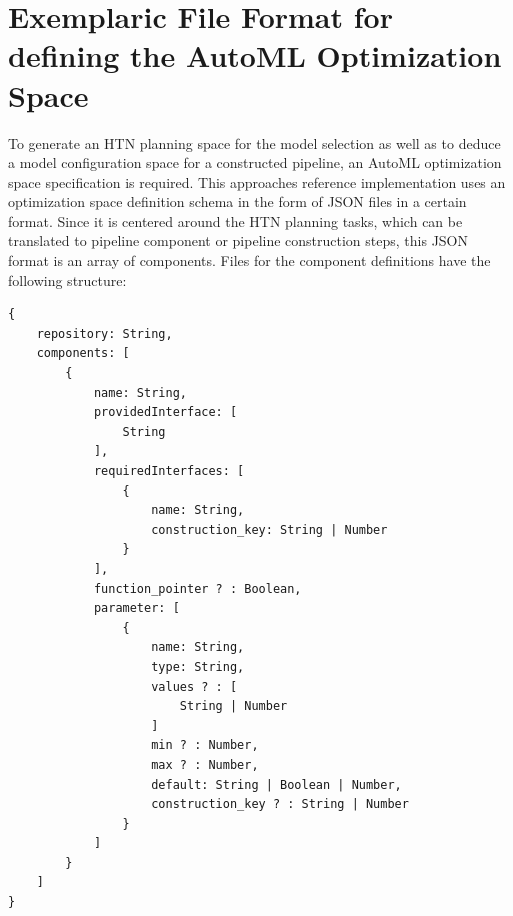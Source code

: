\section{Exemplaric File Format for defining the AutoML Optimization Space}
\label{sec:implementation:json}
To generate an HTN planning space for the model selection as well as to deduce a model configuration space for a constructed pipeline, an AutoML optimization space specification is required.
This approaches reference implementation uses an optimization space definition schema in the form of JSON files in a certain format.\newline
Since it is centered around the HTN planning tasks, which can be translated to pipeline component or pipeline construction steps, this JSON format is an array of components.
Files for the component definitions have the following structure:
\begin{verbatim}
{
    repository: String,
    components: [
        {
            name: String,
            providedInterface: [
                String
            ],
            requiredInterfaces: [
                {
                    name: String,
                    construction_key: String | Number
                }
            ],
            function_pointer ? : Boolean,
            parameter: [
                {
                    name: String,
                    type: String,
                    values ? : [
                        String | Number
                    ]
                    min ? : Number,
                    max ? : Number,
                    default: String | Boolean | Number,
                    construction_key ? : String | Number
                }
            ]
        }
    ]
}
\end{verbatim}

